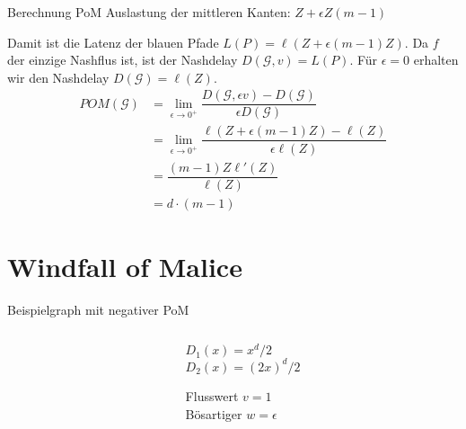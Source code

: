 \documentclass{beamer}
\begin{document}
\begin{frame}{Berechnung PoM}
	Auslastung der mittleren Kanten: $Z + \epsilon Z (m-1)$
	
	Damit ist die Latenz der blauen Pfade $L(P) = \ell (Z + \epsilon (m-1) Z)$.
	Da $f$ der einzige Nashflus ist, ist der Nashdelay $D(\mathcal G, v) = L(P)$.
	Für $\epsilon = 0$ erhalten wir den Nashdelay $D(\mathcal G) = \ell(Z)$.
	\begin{align*}
		POM(\mathcal G) &= \lim_{\epsilon \to 0^+} \dfrac{D(\mathcal G, \epsilon v) - D(\mathcal G)}{\epsilon D(\mathcal G)} \\
			&= \lim_{\epsilon \to 0^+} \dfrac{\ell (Z + \epsilon (m-1) Z) - \ell(Z)}{\epsilon \ell(Z)} \\
			&= \dfrac{(m - 1) Z \ell'(Z)}{\ell(Z)} \\
			&= d \cdot (m - 1)
	\end{align*}
\end{frame}


\section{Windfall of Malice}
\begin{frame}{Beispielgraph mit negativer PoM}
	\begin{columns}[T]
		\begin{column}{0.6\textwidth}
		\end{column}
	
		\begin{column}{0.4\textwidth}
			$D_1(x) = x^d/2$ \\
			$D_2(x) = (2x)^d/2$
			
			Flusswert $v = 1$ \\
			Bösartiger $w = \epsilon$
			
		\end{column}
	\end{columns}
\end{frame}
\end{document}
